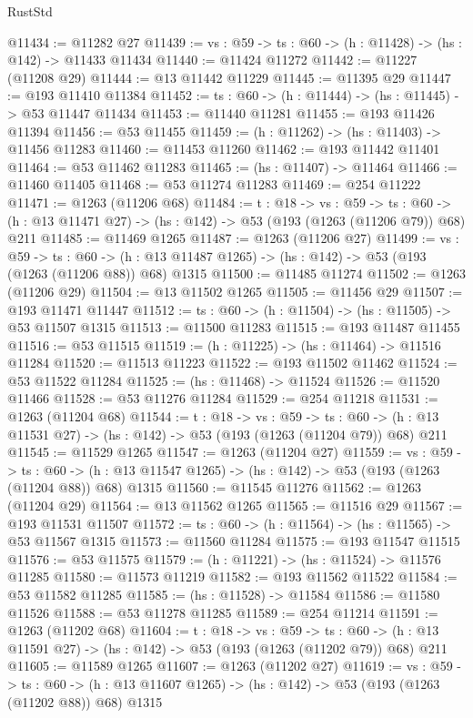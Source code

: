 \begin{lexlean}{RustStd}
\begin{coremodule}
@11434 := @11282 @27
@11439 := {vs : @59} -> {ts : @60} -> (h : @11428) -> (hs : @142) -> @11433 @11434
@11440 := @11424 @11272
@11442 := @11227 (@11208 @29)
@11444 := @13 @11442 @11229
@11445 := @11395 @29
@11447 := @193 @11410 @11384
@11452 := {ts : @60} -> (h : @11444) -> (hs : @11445) -> @53 @11447 @11434
@11453 := @11440 @11281
@11455 := @193 @11426 @11394
@11456 := @53 @11455
@11459 := (h : @11262) -> (hs : @11403) -> @11456 @11283
@11460 := @11453 @11260
@11462 := @193 @11442 @11401
@11464 := @53 @11462 @11283
@11465 := (hs : @11407) -> @11464
@11466 := @11460 @11405
@11468 := @53 @11274 @11283
@11469 := @254 @11222
@11471 := @1263 (@11206 @68)
@11484 := {t : @18} ->
  {vs : @59} ->
  {ts : @60} -> (h : @13 @11471 @27) -> (hs : @142) -> @53 (@193 (@1263 (@11206 @79)) @68) @211
@11485 := @11469 @1265
@11487 := @1263 (@11206 @27)
@11499 := {vs : @59} ->
  {ts : @60} -> (h : @13 @11487 @1265) -> (hs : @142) -> @53 (@193 (@1263 (@11206 @88)) @68) @1315
@11500 := @11485 @11274
@11502 := @1263 (@11206 @29)
@11504 := @13 @11502 @1265
@11505 := @11456 @29
@11507 := @193 @11471 @11447
@11512 := {ts : @60} -> (h : @11504) -> (hs : @11505) -> @53 @11507 @1315
@11513 := @11500 @11283
@11515 := @193 @11487 @11455
@11516 := @53 @11515
@11519 := (h : @11225) -> (hs : @11464) -> @11516 @11284
@11520 := @11513 @11223
@11522 := @193 @11502 @11462
@11524 := @53 @11522 @11284
@11525 := (hs : @11468) -> @11524
@11526 := @11520 @11466
@11528 := @53 @11276 @11284
@11529 := @254 @11218
@11531 := @1263 (@11204 @68)
@11544 := {t : @18} ->
  {vs : @59} ->
  {ts : @60} -> (h : @13 @11531 @27) -> (hs : @142) -> @53 (@193 (@1263 (@11204 @79)) @68) @211
@11545 := @11529 @1265
@11547 := @1263 (@11204 @27)
@11559 := {vs : @59} ->
  {ts : @60} -> (h : @13 @11547 @1265) -> (hs : @142) -> @53 (@193 (@1263 (@11204 @88)) @68) @1315
@11560 := @11545 @11276
@11562 := @1263 (@11204 @29)
@11564 := @13 @11562 @1265
@11565 := @11516 @29
@11567 := @193 @11531 @11507
@11572 := {ts : @60} -> (h : @11564) -> (hs : @11565) -> @53 @11567 @1315
@11573 := @11560 @11284
@11575 := @193 @11547 @11515
@11576 := @53 @11575
@11579 := (h : @11221) -> (hs : @11524) -> @11576 @11285
@11580 := @11573 @11219
@11582 := @193 @11562 @11522
@11584 := @53 @11582 @11285
@11585 := (hs : @11528) -> @11584
@11586 := @11580 @11526
@11588 := @53 @11278 @11285
@11589 := @254 @11214
@11591 := @1263 (@11202 @68)
@11604 := {t : @18} ->
  {vs : @59} ->
  {ts : @60} -> (h : @13 @11591 @27) -> (hs : @142) -> @53 (@193 (@1263 (@11202 @79)) @68) @211
@11605 := @11589 @1265
@11607 := @1263 (@11202 @27)
@11619 := {vs : @59} ->
  {ts : @60} -> (h : @13 @11607 @1265) -> (hs : @142) -> @53 (@193 (@1263 (@11202 @88)) @68) @1315

\end{coremodule}
\end{lexlean}
